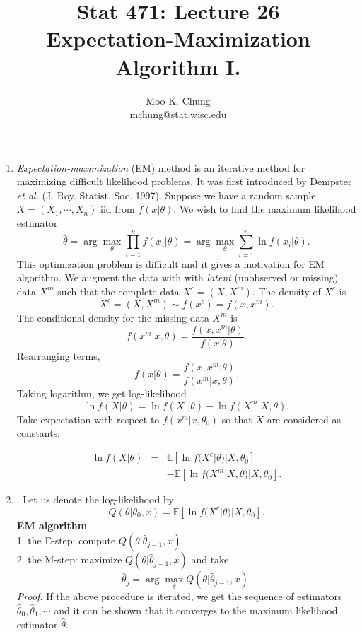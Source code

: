 \documentclass[12pt,twocolumn]{article} %
\newcommand{\bqn}{\begin{eqnarray}}
\newcommand{\eqn}{\end{eqnarray}}
\begin{document}
\title{Stat 471: Lecture 26\\
Expectation-Maximization Algorithm I.}
\author{Moo K. Chung\\
mchung@stat.wisc.edu}
\maketitle \thispagestyle{empty}
\begin{enumerate}
\item {\em Expectation-maximization} (EM) method is an iterative method for maximizing  difficult likelihood problems. It was first introduced by Dempster {\em et al.} (J. Roy. Statist. Soc. 1997). Suppose we have a random sample $X=(X_1,\cdots, X_n)$ iid from $f(x|\theta)$. We wish to find the maximum likelihood estimator 
$$\hat \theta = \arg \max_{\theta} \prod_{i=1}^n f(x_i|\theta) = \arg \max_{\theta} \sum_{i=1}^n \ln f(x_i|\theta).$$ 
This optimization problem is difficult and it gives a motivation for EM algorithm.  
We augment the data with with {\em latent} (unobserved or missing) data $X^m$ such that the
complete data $X^c = (X, X^m)$. The density of $X^c$ is 
$$X^c=(X,X^m) \sim f(x^c) = f(x,x^m).$$ The conditional density for the missing data $X^m$ is
$$f(x^m|x,\theta) = \frac{f(x,x^m|\theta)}{f(x|\theta)}.$$
Rearranging terms,
$$f(x|\theta) = \frac{f(x,x^m|\theta)}{f(x^m|x,\theta)}.$$
Taking logarithm, we get log-likelihood
$$\ln f(X|\theta) = \ln f(X^c|\theta) - \ln f(X^m|X,\theta).$$
Take expectation with respect to $f(x^m|x,\theta_0)$ so that $X$ are considered as constants. 

\bqn \ln f(X|\theta) &=& \mathbb{E} [\ln f(X^c|\theta) |X,\theta_0]\\
&& - \mathbb{E} [\ln f(X^m|X,\theta)|X,\theta_0].
\eqn


\item. Let us denote the log-likelihood by
$$Q(\theta|\theta_0,x) = \mathbb{E} [\ln f(X^c|\theta)|X,\theta_0].$$
{\bf EM algorithm}\\
1. the E-step: compute $Q(\theta|\hat \theta_{j-1},x)$\\
2. the M-step: maximize $Q(\theta|\hat \theta_{j-1},x)$ and take
$$\hat \theta_j = \arg \max_{\theta} Q(\theta|\hat \theta_{j-1},x).$$
{\em Proof.} If the above procedure is iterated, we get the sequence of estimators
$\hat \theta_0,\hat \theta_1, \cdots $ and it can be shown that it converges to
the maximum likelihood estimator $\hat \theta$.\\ 



\end{enumerate}
\end{document}
